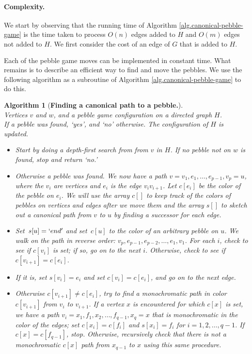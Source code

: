 \documentclass[Svgc,nospthms]{Svgc}
\newtheorem{algorithm}[theorem]{Algorithm}
\newcommand{\refalg}[1]{Algorithm \ref{alg.#1}}
\newcommand{\labelalg}[1]{\label{alg.#1}}
\begin{document}
	\paragraph{Complexity.} We start by observing that the running time of \refalg{canonical-pebble-game} is the time taken to process $O(n)$ edges added to $H$ and $O(m)$ edges not added to $H$. We first consider the cost of an edge of $G$ that is added to $H$.

	Each of the pebble game moves can be implemented in constant time. 
	What remains is to describe an efficient way to find and move the pebbles.  We use the 
	following algorithm as a subroutine of \refalg{canonical-pebble-game} to do this.
	
	\begin{algorithm}
		[\textbf{Finding a canonical path to a pebble.}]\labelalg{find-one-pebble}
\qquad \\
 Vertices $v$ and $w$, and a pebble game configuration on a directed graph $H$. \\
 If a pebble was found, `yes', and `no' otherwise. The configuration of $H$ is updated. \\
\begin{itemize}
	\item	Start by doing a depth-first search from from $v$ in $H$. If no pebble not on $w$ is found, stop and return `no.'

	\item	Otherwise a pebble was found.  We now have a path $v=v_{1},e_{1},\ldots,e_{p-1},v_{p}=u$, where the $v_{i}$ are vertices and $e_{i}$ is the edge $v_{i}v_{i+1}$. Let $c[e_{i}]$ be the color of the pebble on $e_{i}$.  We will use the array $c[]$ to keep track of the colors of pebbles on vertices and edges 
		after we move them and the array $s[]$ to sketch out a canonical path from 
		$v$ to $u$ by finding a successor for each edge.

	\item Set\, $s[u]=`end'$ and set\, $c[u]$ to the color of an arbitrary pebble on $u$. 
	We walk on the path in reverse order: $v_{p},e_{p-1}, e_{p-2}, \ldots, e_{1},v_{1}$.
	For each $i$, check to see if $c[v_{i}]$ is set; if so, go on to the next $i$. Otherwise, check to see if $c[v_{i+1}]=c[e_{i}]$. 
	\item If it is, set $s[v_{i}]=e_{i}$ and set $c[v_{i}]=c[e_{i}]$, and go on to the next edge.
	\item	Otherwise $c[v_{i+1}]\neq c[e_{i}]$, try to find a monochromatic path in color $c[v_{i+1}]$ from $v_{i}$ to $v_{i+1}$. If a vertex $x$ is encountered for which $c[x]$ is set, we have a path $v_{i}=x_{1},f_{1},x_{2},\ldots,f_{q-1},x_{q}=x$ that is monochromatic in the color 
	of the edges; set $c[x_{i}]=c[f_{i}]$ and $s[x_{i}]=f_{i}$ for $i=1,2,\ldots,q-1$. If $c[x]=c[f_{q-1}]$, stop. Otherwise, recursively check that there is not a monochromatic $c[x]$ path from $x_{q-1}$ to $x$ using this same procedure.


\end{itemize}
\end{algorithm}
\end{document}
